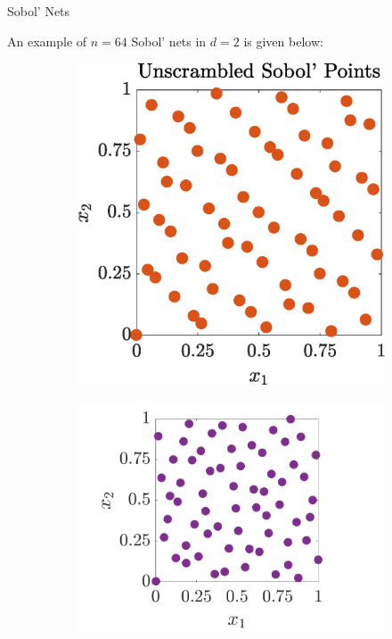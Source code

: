 \documentclass[handout, 10pt,compress,xcolor={usenames,dvipsnames}]{beamer} %
\begin{document}
\begin{frame}{Sobol' Nets}

An example of $n=64$ Sobol' nets in $d=2$ is given below:	

	\vspace{-3ex}
	\begin{figure}[htp]
		\centering
		\begin{subfigure}[b]{0.35\textwidth}
			\includegraphics[width=\textwidth]{../figures/USobolPoints}
		\end{subfigure}
		\centering
		\begin{subfigure}[b]{0.5\textwidth}
			\includegraphics[width=\textwidth]{../figures/SSobolPoints}
		\end{subfigure}
	\end{figure}
\end{frame}
\end{document}
